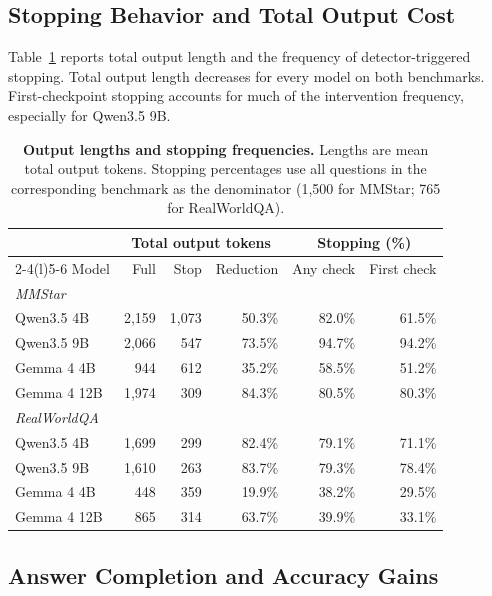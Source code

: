 \documentclass{article} %
\begin{document}
\subsection{Stopping Behavior and Total Output Cost}

Table~\ref{tab:output_stopping_stats} reports total output length and the frequency of detector-triggered stopping. Total output length decreases for every model on both benchmarks. First-checkpoint stopping accounts for much of the intervention frequency, especially for Qwen3.5 9B.

\begin{table}[H]
\centering\small
\renewcommand{\arraystretch}{1.05}
\setlength{\tabcolsep}{4pt}
\caption{\textbf{Output lengths and stopping frequencies.} Lengths are mean total output tokens. Stopping percentages use all questions in the corresponding benchmark as the denominator (1,500 for MMStar; 765 for RealWorldQA).}
\label{tab:output_stopping_stats}
\begin{tabular*}{\textwidth}{@{\extracolsep{\fill}}lrrrrr@{}}
\toprule
& \multicolumn{3}{c}{Total output tokens} & \multicolumn{2}{c}{Stopping (\%)} \\
\cmidrule(lr){2-4}\cmidrule(l){5-6}
Model & Full & Stop & Reduction & Any check & First check \\
\midrule
\multicolumn{6}{l}{\textit{MMStar}} \\
Qwen3.5 4B & 2,159 & 1,073 & 50.3\% & 82.0\% & 61.5\% \\
Qwen3.5 9B & 2,066 & 547 & 73.5\% & 94.7\% & 94.2\% \\
Gemma 4 4B & 944 & 612 & 35.2\% & 58.5\% & 51.2\% \\
Gemma 4 12B & 1,974 & 309 & 84.3\% & 80.5\% & 80.3\% \\
\midrule
\multicolumn{6}{l}{\textit{RealWorldQA}} \\
Qwen3.5 4B & 1,699 & 299 & 82.4\% & 79.1\% & 71.1\% \\
Qwen3.5 9B & 1,610 & 263 & 83.7\% & 79.3\% & 78.4\% \\
Gemma 4 4B & 448 & 359 & 19.9\% & 38.2\% & 29.5\% \\
Gemma 4 12B & 865 & 314 & 63.7\% & 39.9\% & 33.1\% \\
\bottomrule
\end{tabular*}
\end{table}

\subsection{Answer Completion and Accuracy Gains}
\label{app:completion_analysis}
\end{document}

